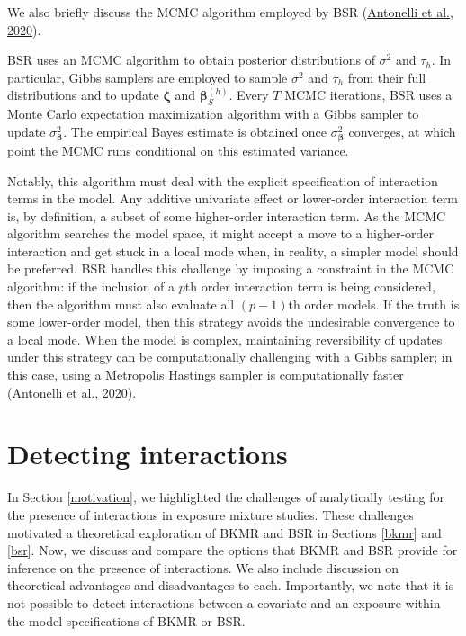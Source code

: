 \documentclass[12pt, twoside]{amherstthesis}
\begin{document}
We also briefly discuss the MCMC algorithm employed by BSR (\protect\hyperlink{ref-antonelli_estimating_2020}{Antonelli et al., 2020}).

BSR uses an MCMC algorithm to obtain posterior distributions of \(\sigma^2\) and \(\tau_h\). In particular, Gibbs samplers are employed to sample \(\sigma^2\) and \(\tau_h\) from their full distributions and to update \(\boldsymbol\zeta\) and \(\boldsymbol\beta_S^{(h)}\). Every \(T\) MCMC iterations, BSR uses a Monte Carlo expectation maximization algorithm with a Gibbs sampler to update \(\sigma^2_{\boldsymbol\beta}\). The empirical Bayes estimate is obtained once \(\sigma^2_{\boldsymbol\beta}\) converges, at which point the MCMC runs conditional on this estimated variance.

Notably, this algorithm must deal with the explicit specification of interaction terms in the model. Any additive univariate effect or lower-order interaction term is, by definition, a subset of some higher-order interaction term. As the MCMC algorithm searches the model space, it might accept a move to a higher-order interaction and get stuck in a local mode when, in reality, a simpler model should be preferred. BSR handles this challenge by imposing a constraint in the MCMC algorithm: if the inclusion of a \(p\)th order interaction term is being considered, then the algorithm must also evaluate all \((p-1)\)th order models. If the truth is some lower-order model, then this strategy avoids the undesirable convergence to a local mode. When the model is complex, maintaining reversibility of updates under this strategy can be computationally challenging with a Gibbs sampler; in this case, using a Metropolis Hastings sampler is computationally faster (\protect\hyperlink{ref-antonelli_estimating_2020}{Antonelli et al., 2020}).

\hypertarget{detecting-interactions}{%
\section{Detecting interactions}\label{detecting-interactions}}

In Section \ref{motivation}, we highlighted the challenges of analytically testing for the presence of interactions in exposure mixture studies. These challenges motivated a theoretical exploration of BKMR and BSR in Sections \ref{bkmr} and \ref{bsr}. Now, we discuss and compare the options that BKMR and BSR provide for inference on the presence of interactions. We also include discussion on theoretical advantages and disadvantages to each. Importantly, we note that it is not possible to detect interactions between a covariate and an exposure within the model specifications of BKMR or BSR.
\end{document}
